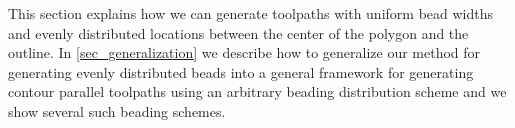 This section explains how we can generate toolpaths with uniform bead widths and evenly distributed locations between the center of the polygon and the outline.
In \cref{sec_generalization} we describe how to generalize our method for generating evenly distributed beads into a general framework for generating contour parallel toolpaths using an arbitrary beading distribution scheme and we show several such beading schemes.










